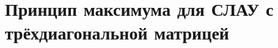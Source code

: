 \documentclass[__main__.tex]{subfiles}
\begin{document}
\section{Принцип максимума для СЛАУ с трёхдиагональной матрицей}
\end{document}

